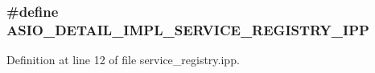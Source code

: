 \subsubsection[{A\+S\+I\+O\+\_\+\+D\+E\+T\+A\+I\+L\+\_\+\+I\+M\+P\+L\+\_\+\+S\+E\+R\+V\+I\+C\+E\+\_\+\+R\+E\+G\+I\+S\+T\+R\+Y\+\_\+\+I\+P\+P}]{\setlength{\rightskip}{0pt plus 5cm}\#define A\+S\+I\+O\+\_\+\+D\+E\+T\+A\+I\+L\+\_\+\+I\+M\+P\+L\+\_\+\+S\+E\+R\+V\+I\+C\+E\+\_\+\+R\+E\+G\+I\+S\+T\+R\+Y\+\_\+\+I\+P\+P}\label{service__registry_8ipp_ac7e8816b5f2ab5ff49d95aa2fb6c89d8}


Definition at line 12 of file service\+\_\+registry.\+ipp.


